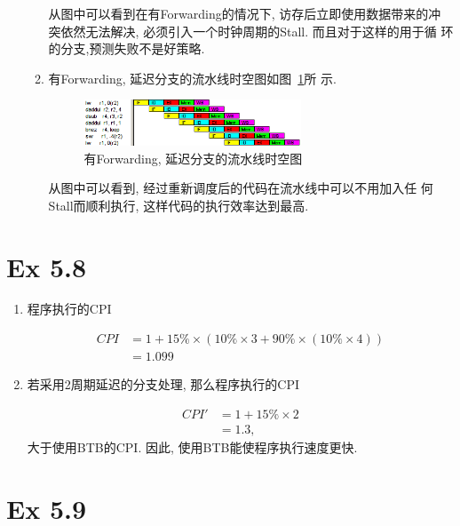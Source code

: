 \begin{solve}
\begin{enumerate}
\begin{enumerate}
      从图中可以看到在有Forwarding的情况下, 访存后立即使用数据带来的冲
      突依然无法解决, 必须引入一个时钟周期的Stall. 而且对于这样的用于循
      环的分支,预测失败不是好策略.
      
    \item 有Forwarding, 延迟分支的流水线时空图如图~\ref{fig:3-11-3}所
      示. 
      
      \begin{figure}[!h]
        \centering
        \includegraphics[width=0.65\textwidth]{img/3.png}
        \caption{有Forwarding, 延迟分支的流水线时空图}
        \label{fig:3-11-3}
      \end{figure}

      从图中可以看到, 经过重新调度后的代码在流水线中可以不用加入任
      何Stall而顺利执行, 这样代码的执行效率达到最高.
    \end{enumerate}
    
  \end{enumerate}
\end{solve}

\section{Ex 5.8}

\begin{solve}
  \begin{enumerate}
  \item 程序执行的CPI

    \begin{align*}
      CPI &= 1 + 15\% \times{} (10\% \times{} 3 + 90\% \times{} (10\%\times{}4)) \\
      &= 1.099
    \end{align*}
  \item 若采用2周期延迟的分支处理, 那么程序执行的CPI

    \begin{align*}
      CPI' &= 1 + 15\% \times{} 2\\
      &= 1.3,
    \end{align*}
    大于使用BTB的CPI. 因此, 使用BTB能使程序执行速度更快.
  \end{enumerate}
\end{solve}

\section{Ex 5.9}

